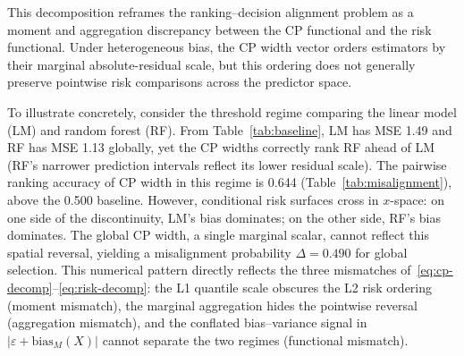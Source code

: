 \documentclass[pdflatex,sn-mathphys-ay]{sn-jnl}%
\theoremstyle{thmstyleone}%
\theoremstyle{thmstyletwo}%
\theoremstyle{thmstylethree}%
\begin{document}
This decomposition reframes the ranking--decision alignment problem as a moment and aggregation discrepancy between the CP functional and the risk functional. Under heterogeneous bias, the CP width vector orders estimators by their marginal absolute-residual scale, but this ordering does not generally preserve pointwise risk comparisons across the predictor space.

To illustrate concretely, consider the threshold regime comparing the linear model (LM) and random forest (RF). From Table~\ref{tab:baseline}, LM has MSE 1.49 and RF has MSE 1.13 globally, yet the CP widths correctly rank RF ahead of LM (RF's narrower prediction intervals reflect its lower residual scale). The pairwise ranking accuracy of CP width in this regime is 0.644 (Table~\ref{tab:misalignment}), above the 0.500 baseline. However, conditional risk surfaces cross in $x$-space: on one side of the discontinuity, LM's bias dominates; on the other side, RF's bias dominates. The global CP width, a single marginal scalar, cannot reflect this spatial reversal, yielding a misalignment probability $\Delta = 0.490$ for global selection. This numerical pattern directly reflects the three mismatches of~\eqref{eq:cp-decomp}--\eqref{eq:risk-decomp}: the L1 quantile scale obscures the L2 risk ordering (moment mismatch), the marginal aggregation hides the pointwise reversal (aggregation mismatch), and the conflated bias--variance signal in $|\varepsilon + \text{bias}_M(X)|$ cannot separate the two regimes (functional mismatch).
\end{document}
